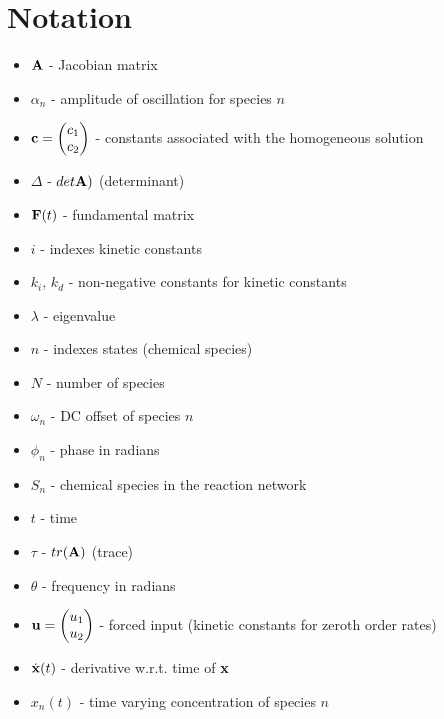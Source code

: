 \documentclass{bmcart}
\begin{document}
\section*{Notation}
\begin{itemize}
\item ${\bf A}$ - Jacobian matrix
\item $\alpha_n$ - amplitude of oscillation for species $n$
\item ${\bf c} = \begin{pmatrix} c_1 \\ c_2 \end{pmatrix}$ - constants associated with the homogeneous solution
\item $\Delta$ -
$det {\bf A})$ (determinant)
\item  ${\bf F} (t)$ - fundamental matrix
\item $i$ - indexes kinetic constants
\item $k_i$, $k_d$ -
non-negative constants for kinetic constants
\item $\lambda$ -
eigenvalue
\item $n$ - indexes states (chemical species)
\item $N$ - number of species
\item $\omega_n$ - DC offset of species $n$ 
\item $\phi_n$ - phase in radians
\item $S_n$ - chemical species in the reaction network
\item $t$ - time 
\item $\tau$ - $tr({\bf A})$ (trace)
\item $\theta$ - frequency in
radians 
\item ${\bf u} = \begin{pmatrix} u_1 \\ u_2 \end{pmatrix}$ - forced input (kinetic constants for zeroth order
rates)
\item $\dot{\bf x} (t)$ - derivative w.r.t. time of ${\bf x}$
\item $x_n(t)$
 - time varying concentration of species $n$
\end{itemize}
\end{document}

